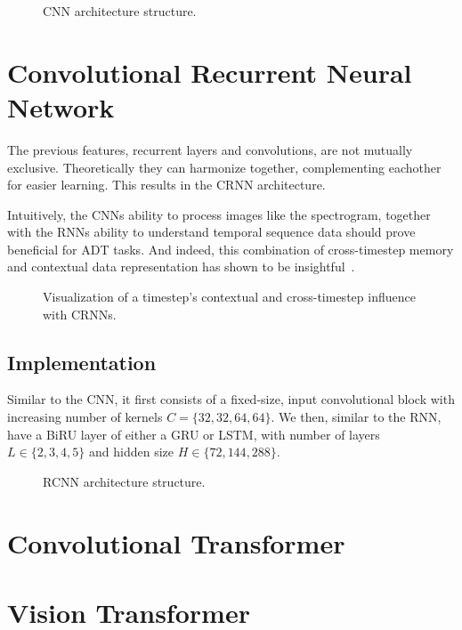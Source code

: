\begin{figure}[H]
    \centering
    
    \caption{CNN architecture structure.}
    \label{CNNFigure}
\end{figure}

\section{Convolutional Recurrent Neural Network}

The previous features, recurrent layers and convolutions, are not mutually exclusive. Theoretically they can harmonize together, complementing eachother for easier learning. This results in the \gls{CRNN} architecture.

Intuitively, the \gls{CNN}s ability to process images like the spectrogram, together with the \gls{RNN}s ability to understand temporal sequence data should prove beneficial for \gls{ADT} tasks. And indeed, this combination of cross-timestep memory and contextual data representation has shown to be insightful~\cite{Vogl2017DrumTV, vogl2018multiinstrumentdrumtranscription, signals4040042}.

\begin{figure}[H]
    \centering
    
    \caption{Visualization of a timestep's contextual and cross-timestep influence with CRNNs.}
    \label{CRNNInfluenceFigure}
\end{figure}

\subsection{Implementation}

Similar to the \gls{CNN}, it first consists of a fixed-size, input convolutional block with increasing number of kernels $C = \{32, 32, 64, 64\}$. We then, similar to the \gls{RNN}, have a \gls{BiRU} layer of either a \gls{GRU} or \gls{LSTM}, with number of layers $L \in \{2, 3, 4, 5\}$ and hidden size $H \in \{72, 144, 288\}$.

\begin{figure}[H]
    \centering
    
    \caption{RCNN architecture structure.}
    \label{CRNNFigure}
\end{figure}

\section{Convolutional Transformer}

\section{Vision Transformer}